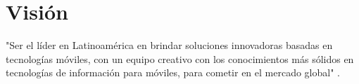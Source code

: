 \section{Visión} \label{Vision}
"Ser el líder en Latinoamérica en brindar soluciones innovadoras basadas en tecnologías móviles, con un equipo creativo con los conocimientos más sólidos en tecnologías de información para móviles, para cometir en el mercado global" \cite{DIG1}.